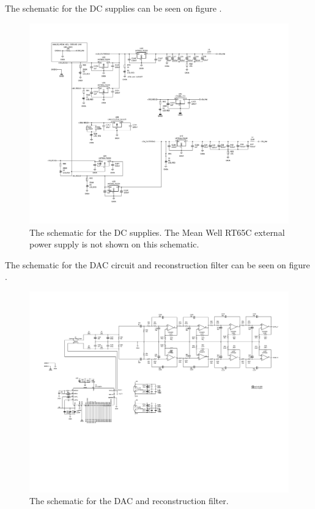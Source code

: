 The schematic for the DC supplies can be seen on figure .

\begin{figure}[H]
    \centering
    \includegraphics[clip, trim=0 50 0 0, width=1\textwidth]{Appendix/Figures/A_SCH_DCSUPPLY.pdf}
    \caption{The schematic for the DC supplies. The Mean Well RT65C external power supply is not shown on this schematic.}
    \label{fig_A_SCH_DCSUPPLY}
\end{figure}

The schematic for the DAC circuit and reconstruction filter can be seen on figure .
\begin{figure}[H]
    \centering
    \includegraphics[clip, trim=0 200 0 0, width=1\textwidth]{Appendix/Figures/A_SCH_DAC.pdf}
    \caption{The schematic for the DAC and reconstruction filter.}
    \label{fig_A_SCH_DAC}
\end{figure}

